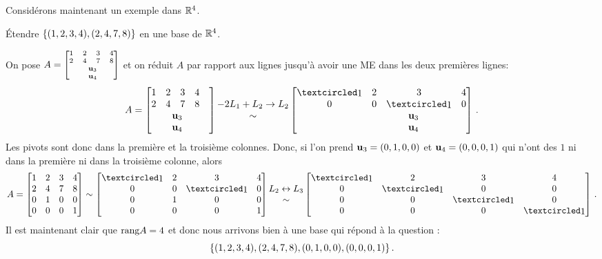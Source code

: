 Consid\'erons maintenant un exemple dans $\mathbb{R}^4$.

\begin{myexample}

Étendre $\{(1,2,3,4), (2,4,7,8)\}$ en une base de $\mathbb{R}^4$.


On pose  $A=\scriptsize\mat{1&2&3&4\\2&4&7&8\\ &&\hspace{-0.4cm}\uu_3 \\ && \hspace{-0.4cm}\uu_4}$ et on réduit $A$ par rapport aux lignes jusqu'\`a avoir une ME dans les deux premières lignes:
$$A=\mat{1&2&3&4\\2&4&7&8\\ &&\hspace{-0.4cm}\uu_3 \\ && \hspace{-0.4cm}\uu_4&&}
\begin{matrix} -2L_1+L_2\to L_2\\ \sim\end{matrix} \mat{\pivot&2&3&4\\0&0&\pivot&0\\ &&\hspace{-0.4cm}\uu_3  \\ && \hspace{-0.4cm}\uu_4 }\,. $$
Les pivots sont donc dans la premi\`ere et la troisi\`eme colonnes. Donc, si l'on prend $\mathbf{u}_3=(0,1,0,0)$ et $\mathbf{u}_4=(0,0,0,1)$ qui n'ont des $1$ ni dans la première ni dans la troisième colonne, alors
$$A =\mat{1&2&3&4\\2&4&7&8\\ 0&1&0&0\\ 0&0&0&1} \sim \mat{\pivot&2&3&4\\0&0&\pivot&0\\ 0&1&0&0  \\  0&0&0&1 }\begin{matrix}  L_2\leftrightarrow L_3\\ \sim\end{matrix} \mat{\pivot&2&3&4\\0&\pivot&0&0 \\ 0&0&\pivot&0  \\  0&0&0&\pivot }\,. $$ Il est maintenant clair que $\textrm{rang} A=4$ et donc nous arrivons bien à une base qui r\'epond \`a la question : 
$$ \{(1,2,3,4), (2,4,7,8), (0,1,0,0),(0,0,0,1)\}\,.$$
\end{myexample}

